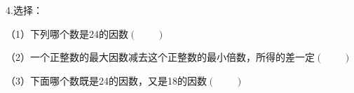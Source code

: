 \question 4.选择：

（1）下列哪个数是24的因数\hfill$\left(\qquad\right)$


（2）一个正整数的最大因数减去这个正整数的最小倍数，所得的差一定\hfill$\left(\qquad\right)$


（3）下面哪个数既是24的因数，又是18的因数\hfill$\left(\qquad\right)$

